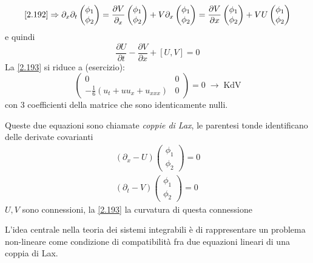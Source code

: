 \documentclass[a4paper,11pt]{report}
\begin{document}
\[
\eqref{2.192} \Rightarrow \partial_x\partial_t\left(\begin{matrix}
\phi_1 \\
\phi_2
\end{matrix} \right)=\frac{\partial V}{\partial_x}\left(\begin{matrix}
\phi_1 \\
\phi_2
\end{matrix} \right) + V\partial_x \left(\begin{matrix}
\phi_1 \\
\phi_2
\end{matrix} \right) =\frac{\partial V}{\partial x}\left(\begin{matrix}
\phi_1 \\
\phi_2
\end{matrix} \right) + VU \left(\begin{matrix}
\phi_1 \\
\phi_2
\end{matrix} \right)
\]
e quindi
\begin{equation}
\frac{\partial U}{\partial t} - \frac{\partial V}{\partial x} + \left[U,V\right]=0
\label{2.193}
\end{equation}
La \eqref{2.193} si riduce a (esercizio):
\[
\left(\begin{matrix}
0 & 0 \\
-\frac{1}{6}\left(u_t + u u_x + u_{xxx}\right) & 0
\end{matrix} \right) = 0 \;\rightarrow\; \text{KdV}
\]
con 3 coefficienti della matrice che sono identicamente nulli.

\medskip

Queste due equazioni sono chiamate \emph{coppie di Lax}, le parentesi tonde identificano delle derivate covarianti
\[
\begin{matrix}
\left(\partial_x - U \right)\left(\begin{matrix}
\phi_1 \\
\phi_2
\end{matrix} \right) =0 \\
\left(\partial_t - V \right)\left(\begin{matrix}
\phi_1 \\
\phi_2
\end{matrix} \right) = 0
\end{matrix}
\]
$U,V$ sono connessioni, la \eqref{2.193} la curvatura di questa connessione

\medskip

L'idea centrale nella teoria dei sistemi integrabili \`e di rappresentare un problema non-lineare come condizione di compatibilit\`a fra due equazioni lineari di una coppia di Lax.
\end{document}
